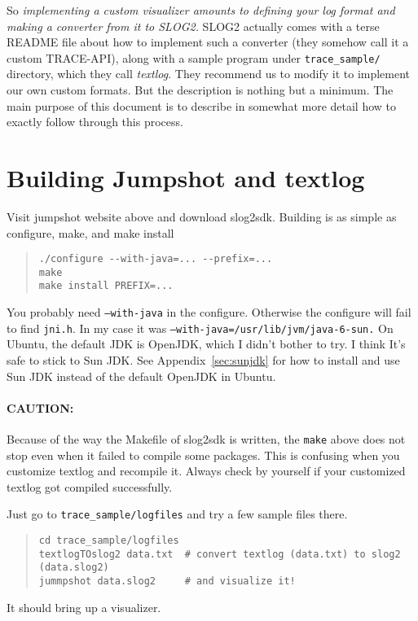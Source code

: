 \documentclass{article}
\begin{document}
So {\em implementing a custom visualizer amounts to defining your log
  format and making a converter from it to SLOG2.}  SLOG2 actually
comes with a terse README file about how to implement such a converter
(they somehow call it a custom TRACE-API), along with a sample program
under {\tt trace\_sample/} directory, which they call {\it textlog}.
They recommend us to modify it to implement our own custom formats.
But the description is nothing but a minimum.  The main purpose of
this document is to describe in somewhat more detail how to exactly
follow through this process.

\section{Building Jumpshot and textlog}
Visit jumpshot website above and download slog2sdk.  Building is as simple as 
configure, make, and make install
\begin{quote}
\begin{verbatim}
./configure --with-java=... --prefix=...
make
make install PREFIX=...
\end{verbatim}
\end{quote}
You probably need {\tt --with-java} in the configure.
Otherwise the configure will fail to find {\tt jni.h}.
In my case it was {\tt --with-java=/usr/lib/jvm/java-6-sun.}  
On Ubuntu, the default
JDK is OpenJDK, which I didn't bother to try.  I think It's safe to stick to Sun JDK.  
See Appendix~\ref{sec:sunjdk} for how to install and use Sun JDK instead of the default OpenJDK in Ubuntu.

\paragraph{CAUTION:} Because of the way the Makefile of slog2sdk is written, 
the {\tt make} above does not stop even when it failed to compile some packages.
This is confusing when you customize textlog and recompile it.  Always check by yourself
if your customized textlog got compiled successfully.


Just go to {\tt trace\_sample/logfiles} and try a few sample files there.
\begin{quote}
\begin{verbatim}
cd trace_sample/logfiles
textlogTOslog2 data.txt  # convert textlog (data.txt) to slog2 (data.slog2)
jummpshot data.slog2     # and visualize it!
\end{verbatim}
\end{quote}
It should bring up a visualizer.
\end{document}
